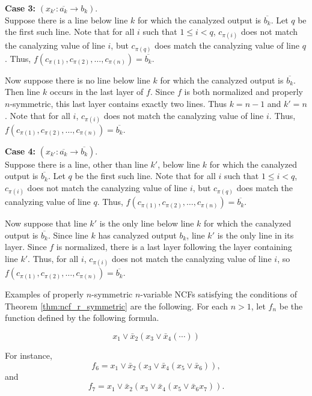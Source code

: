 \noindent
{\bf Case 3:} $(x_{k'} : \overline{a_k} \rightarrow b_k)$. \\

Suppose there is a line below line $k$ for which the canalyzed
output is $\overline{b_k}$.  Let $q$ be the first such line.  Note
that for all $i$ such that $1 \leq i < q$, $c_{\pi(i)}$ does not
match the canalyzing value of line $i$, but $c_{\pi(q)}$ does match
the canalyzing value of line $q$.  Thus, $f(c_{\pi(1)}, c_{\pi(2)},
\ldots, c_{\pi(n)}) = \overline{b_k}$.

Now suppose there is no line below line $k$ for which the canalyzed
output is $\overline{b_k}$.  Then line $k$ occurs in the last layer
of $f$.  Since $f$ is both normalized and properly $n$-symmetric,
this last layer contains exactly two lines.  Thus $k = n-1$ and $k'
= n$.  Note that for all $i$, $c_{\pi(i)}$ does not match the
canalyzing value of line $i$.  Thus, $f(c_{\pi(1)}, c_{\pi(2)},
\ldots, c_{\pi(n)}) = \overline{b_k}$.

\noindent
{\bf Case 4:} $(x_{k'} : \overline{a_k} \rightarrow \overline{b_k})$. \\

Suppose there is a line, other than line $k'$, below line $k$ for
which the canalyzed output is $\overline{b_k}$.  Let $q$ be the
first such line.  Note that for all $i$ such that $1 \leq i < q$,
$c_{\pi(i)}$ does not match the canalyzing value of line $i$, but
$c_{\pi(q)}$ does match the canalyzing value of line $q$.  Thus,
$f(c_{\pi(1)}, c_{\pi(2)}, \ldots, c_{\pi(n)}) = \overline{b_k}$.

Now suppose that line $k'$ is the only line below line $k$ for which
the canalyzed output is $\overline{b_k}$.  Since line $k$ has
canalyzed output $b_k$, line $k'$ is the only line in its layer.
Since $f$ is normalized, there is a last layer following the layer
containing line $k'$.  Thus, for all $i$, $c_{\pi(i)}$ does not
match the canalyzing value of line $i$, so $f(c_{\pi(1)}, c_{\pi(2)},
\ldots, c_{\pi(n)}) = \overline{b_k}$.  \QED


Examples of properly $n$-symmetric $n$-variable NCFs satisfying the
conditions of Theorem \ref{thm:ncf_r_symmetric} are the following.
For each $n > 1$, let $f_n$ be the function defined by the following
formula.

$$x_1 \vee \bar{x}_2 ( x_3 \vee \bar{x}_4 (\cdots  ) )$$

For instance,
$$f_6 = x_1 \vee \bar{x}_2 ( x_3 \vee \bar{x}_4 ( x_5 \vee \bar{x}_6  ) ),$$
and
$$f_7 = x_1 \vee \bar{x}_2 ( x_3 \vee \bar{x}_4 ( x_5 \vee \bar{x}_6   x_7) ).$$


